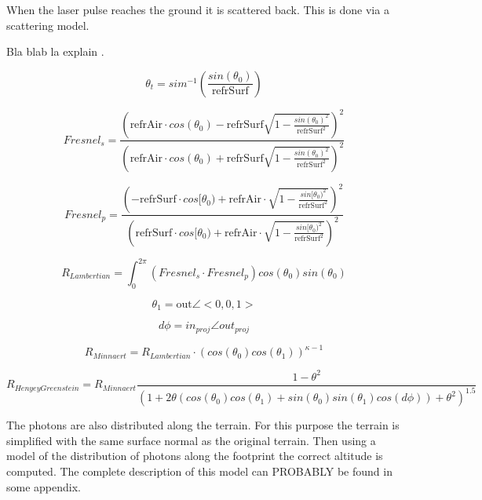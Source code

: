 When the laser pulse reaches the ground it is scattered back. This is done via a scattering model.{Bla blab la explain .

\begin{equation}
	\theta _t = sim^{-1}\left(\frac{sin(\theta _0)}{\text{refrSurf}}\right)
\end{equation}

\begin{equation}
Fresnel_s= \frac{\left(\text{refrAir} \cdot cos(\theta _0)-\text{refrSurf}\sqrt{1-\frac{sin(\theta _0)^2}{\text{refrSurf}^2}}\right)^2}
							  {\left(\text{refrAir} \cdot cos(\theta _0)+\text{refrSurf} \sqrt{1-\frac{sin(\theta _0)^2}{\text{refrSurf}^2}}\right)^2}
\end{equation}

\begin{equation}
	Fresnel_p = \frac{\left(-\text{refrSurf} \cdot cos[\theta _0)+\text{refrAir} \cdot \sqrt{1-\frac{sin[\theta _0)^2} {\text{refrSurf}^2}} \right)^2}
								 	 {\left(\text{refrSurf} \cdot cos[\theta _0)+\text{refrAir} \cdot \sqrt{1-\frac{sin[\theta _0)^2} {\text{refrSurf}^2}} \right)^2}
\end{equation}

\begin{equation}
	R_{Lambertian} = \int_0^{2\pi} \left(Fresnel_s \cdot Fresnel_p \right) cos(\theta _0)sin(\theta _0)
\end{equation}

\begin{equation}
	\theta_1 = \text{out} \angle <0,0,1>
\end{equation}

\begin{equation} 
	d \phi = in_{proj} \angle out_{proj}
\end{equation}

\begin{equation}
	R_{Minnaert} = R_{Lambertian} \cdot (cos(\theta _0) cos(\theta _1))^{\kappa-1}
\end{equation}

\begin{equation}
	R_{HenyeyGreenstein}=R_{Minnaert} \frac{1 - \theta^2 }{ (1 + 2 \theta (cos(\theta_0) cos(\theta _1) + sin(\theta _0)  sin(\theta _1) cos(d \phi))+ \theta^2 )^{1.5}}
\end{equation}

The photons are also distributed along the terrain. For this purpose the terrain is simplified with the same surface normal as the original terrain. Then using a model of the distribution of photons along the footprint the correct altitude is computed. The complete description of this model can PROBABLY be found in some appendix.

}
